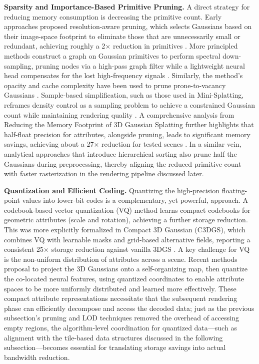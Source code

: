 \documentclass[11pt,a4paper]{article}
\begin{document}
\textbf{Sparsity and Importance-Based Primitive Pruning.} A direct strategy for reducing memory consumption is decreasing the primitive count. Early approaches proposed resolution-aware pruning, which selects Gaussians based on their image-space footprint to eliminate those that are unnecessarily small or redundant, achieving roughly a 2$\times$ reduction in primitives \cite{arxiv:2406.17074v1}. More principled methods construct a graph on Gaussian primitives to perform spectral down-sampling, pruning nodes via a high-pass graph filter while a lightweight neural head compensates for the lost high-frequency signals \cite{arxiv:2405.00676v1}. Similarly, the method's opacity and cache complexity have been used to prune prone-to-vacancy Gaussians \cite{arxiv:2405.00676v1}. Sample-based simplification, such as those used in Mini-Splatting, reframes density control as a sampling problem to achieve a constrained Gaussian count while maintaining rendering quality \cite{arxiv:2403.14166v1}. A comprehensive analysis from Reducing the Memory Footprint of 3D Gaussian Splatting further highlights that half-float precision for attributes, alongside pruning, leads to significant memory savings, achieving about a 27$\times$ reduction for tested scenes \cite{arxiv:2406.17074v1}. In a similar vein, analytical approaches that introduce hierarchical sorting also prune half the Gaussians \cite{arxiv:2402.00525v1} during preprocessing, thereby aligning the reduced primitive count with faster rasterization in the rendering pipeline discussed later.

\textbf{Quantization and Efficient Coding.} Quantizing the high-precision floating-point values into lower-bit codes is a complementary, yet powerful, approach. A codebook-based vector quantization (VQ) method \cite{arxiv:2406.17074v1} learns compact codebooks for geometric attributes (scale and rotation), achieving a further storage reduction. This was more explicitly formalized in Compact 3D Gaussian (C3DGS), which combines VQ with learnable masks and grid-based alternative fields, reporting a consistent 25$\times$ storage reduction against vanilla 3DGS \cite{arxiv:2311.13681v2}. A key challenge for VQ is the non-uniform distribution of attributes across a scene. Recent methods \cite{arxiv:2311.13681v2} proposal to project the 3D Gaussians onto a self-organizing map, then quantize the co-located neural features, using quantized coordinates to enable attribute spaces to be more uniformly distributed and learned more effectively. These compact attribute representations necessitate that the subsequent rendering phase can efficiently decompose and access the decoded data; just as the previous subsection's pruning and LOD techniques removed the overhead of accessing empty regions, the algorithm-level coordination for quantized data---such as alignment with the tile-based data structures discussed in the following subsection---becomes essential for translating storage savings into actual bandwidth reduction.
\end{document}
